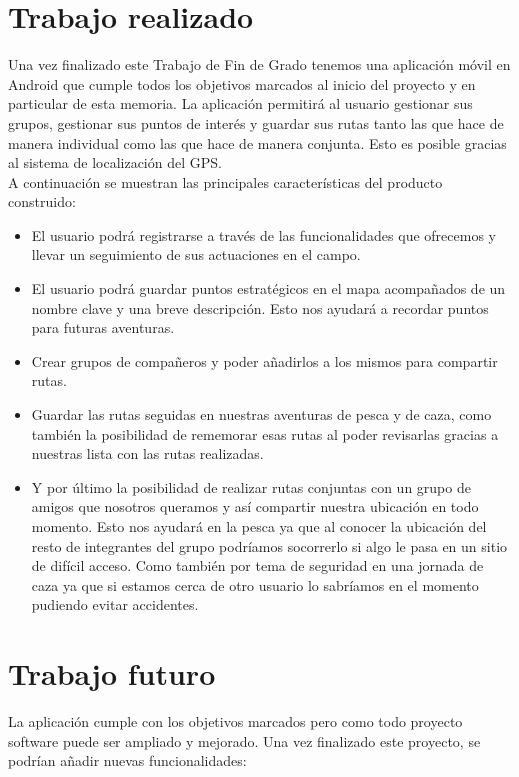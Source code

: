 

\section{Trabajo realizado}
Una vez finalizado este Trabajo de Fin de Grado tenemos una aplicación móvil en Android que cumple todos los objetivos marcados al inicio del proyecto y en particular de esta memoria. La aplicación permitirá al usuario gestionar sus grupos, gestionar sus puntos de interés y guardar sus rutas tanto las que hace de manera individual como las que hace de manera conjunta. Esto es posible gracias al sistema de localización del GPS.\\


A continuación se muestran las principales características del producto construido: 

\begin{itemize}
\item El usuario podrá registrarse a través  de las funcionalidades que ofrecemos y llevar un seguimiento de sus actuaciones en el campo.
\item El usuario podrá guardar puntos estratégicos en el mapa acompañados de un nombre clave y una breve descripción. Esto nos ayudará a recordar puntos para futuras aventuras. 
\item Crear grupos de compañeros y poder añadirlos a los mismos para compartir rutas.
\item Guardar las rutas seguidas en nuestras aventuras de pesca y de caza, como también la posibilidad de rememorar esas rutas al poder revisarlas gracias a nuestras lista con las rutas realizadas.
\item Y por último la posibilidad de realizar rutas conjuntas con un grupo de amigos que nosotros queramos y así compartir nuestra ubicación en todo momento. Esto nos ayudará en la pesca ya que al conocer la ubicación del resto de integrantes del grupo podríamos socorrerlo si algo le pasa en un sitio de difícil acceso. Como también por tema de seguridad en una jornada de caza ya que si estamos cerca de otro usuario lo sabríamos en el momento pudiendo evitar accidentes.
\end{itemize}  

\section{Trabajo futuro}
 La aplicación cumple con los objetivos marcados pero como todo proyecto software puede ser ampliado y mejorado. Una vez finalizado este proyecto, se podrían añadir nuevas funcionalidades:



